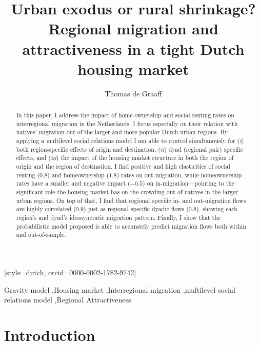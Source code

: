 \documentclass[a4paper,fleqn]{cas-dc}
\begin{document}
\let\WriteBookmarks\relax
\def\floatpagepagefraction{1}
\def\textpagefraction{.001}


\title [mode = title]{ Urban exodus or rural shrinkage? Regional migration and attractiveness in a tight Dutch housing market}                      
  \author[1,2]{Thomas de Graaff}[style=dutch, orcid=0000-0002-1782-9742]
  \cormark[1]
  \fnmark[1]
\address[1]{Vrije Universiteit Amsterdam}
\address[2]{Tinbergen Institute Amsterdam}

\begin{abstract}
In this paper, I address the impact of home-ownership and social
  renting rates on interregional migration in the Netherlands. I focus
  especially on their relation with natives' migration out of the larger and
  more popular Dutch urban regions. By applying a multilevel social relations model I
  am able to control simultanously for (\emph{i}) both region-specific effects
  of origin and destination, (\emph{ii}) dyad (regional pair) specific effects,
  and (\emph{iii}) the impact of the housing market structure in both the region
  of origin and the region of destination. I find positive and high elasticities
  of social renting ($0.8$) and homeownership ($1.8$) rates on out-migration,
  while homeownership rates have a smaller and negative impact ($-0.5$) on
  in-migration---pointing to the significant role the housing market has on the
  crowding out of natives in the larger urban regions. On top of that, I find that regional
  specific in- and out-migration flows are highly correlated ($0.9$) just as
  regional specific dyadic flows ($0.8$), showing each region's and dyad's
  ideosyncratic migration pattern. Finally, I show that the probabilistic
  model proposed is able to accurately predict migration flows both within and out-of-sample.
\end{abstract}


\begin{keywords}
Gravity model \sep Housing market \sep Interregional migration  \sep multilevel social relations model  \sep Regional Attractiveness
\end{keywords}

\maketitle

\section{Introduction}\label{Introduction}
\end{document}
